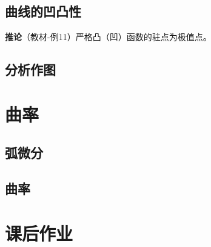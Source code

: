% 



\subsection{曲线的凹凸性}







{\bf 推论}（教材-例11）严格凸（凹）函数的驻点为极值点。

\subsection{分析作图}



\section{曲率}

% 



\subsection{弧微分}



\subsection{曲率}





\section*{课后作业}

